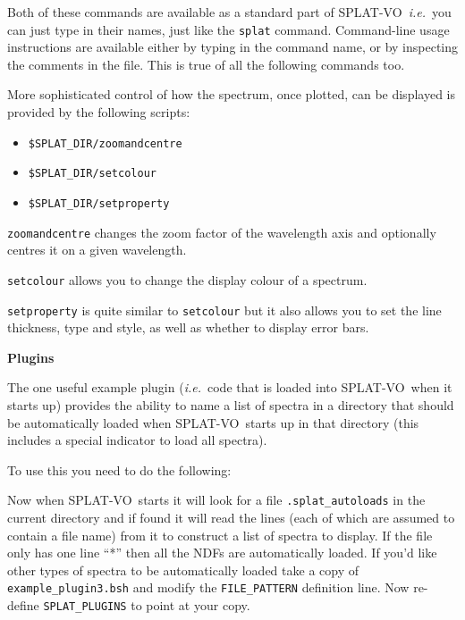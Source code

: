 \documentclass[twoside,11pt,nolof]{starlink}
\providecommand{\SPLAT}{\textsf{SPLAT-VO}}
\providecommand{\hitext}[1]{\texttt{#1}}
\providecommand{\ie}{\textit{i.e.}}
\providecommand{\subheading}[1]{\textbf{\large{#1}}}
\begin{document}
Both of these commands are available as a standard part of \SPLAT\
\ie\ you can just type in their names, just like the \hitext{splat}
command. Command-line usage instructions
are available either by typing in the command name, or by inspecting
the comments in the file. This is true of all the following commands too.

More sophisticated control of how the spectrum, once plotted, can be
displayed is provided by the following scripts:
\begin{itemize}
 \item \hitext{\$SPLAT\_DIR/zoomandcentre}
 \item \hitext{\$SPLAT\_DIR/setcolour}
 \item \hitext{\$SPLAT\_DIR/setproperty}
\end{itemize}
\hitext{zoomandcentre} changes the zoom factor of the wavelength axis
and optionally centres it on a given wavelength.

\hitext{setcolour} allows you to change the display colour of a spectrum.

\hitext{setproperty} is quite similar to \hitext{setcolour} but it
also allows you to set the line thickness, type and style, as well as
whether to display error bars.

\subheading{Plugins}

The one useful example plugin (\ie\ code that is loaded into \SPLAT\
when it starts up) provides the ability to name a list of spectra in a
directory that should be automatically loaded when \SPLAT\ starts up
in that directory (this includes a special indicator to load all
spectra).

To use this you need to do the following:
\begin{quote}
\begin{terminalv}
\end{terminalv}
\end{quote}
Now when \SPLAT\ starts it will look for a file
\hitext{.splat\_autoloads}  in the current directory and if found
it will read the lines (each of which are
assumed to contain a file name) from it to construct a list of spectra
to display. If the file only has one line ``*'' then all the NDFs are
automatically loaded. If you'd like other types of spectra to be
automatically loaded take a copy of \hitext{example\_plugin3.bsh} and
modify the \hitext{FILE\_PATTERN} definition line. Now re-define
\hitext{SPLAT\_PLUGINS} to point at your copy.
\end{document}
